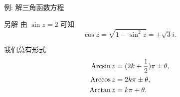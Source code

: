 \begin{frame}{例: 解三角函数方程}
	\onslide<+->
	\begin{proofblock}{另解}
	由 $\sin z=2$ 可知
	\[\cos z=\sqrt{1-\sin^2 z}=\pm\sqrt 3i.\]
	\onslide<+->{
		\[z=-i\Ln[(2\pm\sqrt 3)i]=\left(2k+\half\right)\pi\pm i\ln(2+\sqrt3),\quad k\in\BZ.\]}
	\vspace{-\baselineskip}
	\end{proofblock}
	\onslide<+->
	我们总有形式
	\begin{align*}
		\operatorname{Arcsin} z&=(2k+\frac{1}{2})\pi\pm \theta,\\
		\operatorname{Arccos} z&=2k\pi\pm \theta,\\
		\operatorname{Arctan} z&=k\pi+\theta.
	\end{align*}
\end{frame}

